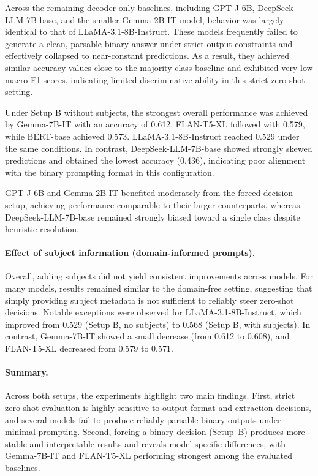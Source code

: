 Across the remaining decoder-only baselines, including GPT-J-6B, DeepSeek-LLM-7B-base, and the smaller Gemma-2B-IT model, behavior was largely identical to that of LLaMA-3.1-8B-Instruct. These models frequently failed to generate a clean, parsable binary answer under strict output constraints and effectively collapsed to near-constant predictions. As a result, they achieved similar accuracy values close to the majority-class baseline and exhibited very low macro-F1 scores, indicating limited discriminative ability in this strict zero-shot setting.

Under Setup B without subjects, the strongest overall performance was achieved by Gemma-7B-IT with an accuracy of 0.612. FLAN-T5-XL followed with 0.579, while BERT-base achieved 0.573. LLaMA-3.1-8B-Instruct reached 0.529 under the same conditions. In contrast, DeepSeek-LLM-7B-base showed strongly skewed predictions and obtained the lowest accuracy (0.436), indicating poor alignment with the binary prompting format in this configuration.

GPT-J-6B and Gemma-2B-IT benefited moderately from the forced-decision setup, achieving performance comparable to their larger counterparts, whereas DeepSeek-LLM-7B-base remained strongly biased toward a single class despite heuristic resolution.


\paragraph{Effect of subject information (domain-informed prompts).}
 Overall, adding subjects did not yield consistent improvements across models. For many models, results remained similar to the domain-free setting, suggesting that simply providing subject metadata is not sufficient to reliably steer zero-shot decisions. Notable exceptions were observed for LLaMA-3.1-8B-Instruct, which improved from 0.529 (Setup B, no subjects) to 0.568 (Setup B, with subjects). In contrast, Gemma-7B-IT showed a small decrease (from 0.612 to 0.608), and FLAN-T5-XL decreased from 0.579 to 0.571.

\paragraph{Summary.}
Across both setups, the experiments highlight two main findings. First, strict zero-shot evaluation is highly sensitive to output format and extraction decisions, and several models fail to produce reliably parsable binary outputs under minimal prompting. Second, forcing a binary decision (Setup~B) produces more stable and interpretable results and reveals model-specific differences, with Gemma-7B-IT and FLAN-T5-XL performing strongest among the evaluated baselines.

